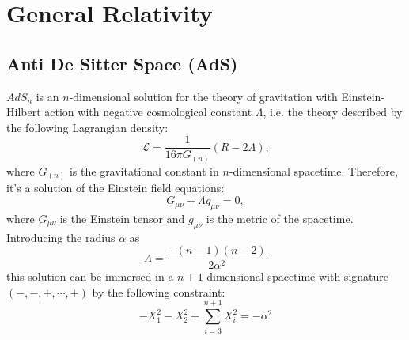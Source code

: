 \chapter{General Relativity}
\adjustmtc
\minitoc
{}
\section{Anti De Sitter Space (AdS)}
$AdS_n$ is an $n$-dimensional solution for the theory of gravitation with Einstein-Hilbert action with negative cosmological constant $\Lambda$, i.e. the theory described by the following Lagrangian density:
\begin{equation}
\mathcal{L} = \frac{1}{16\pi G_{(n)}}(R-2\Lambda),
\end{equation}
where $G_{(n)}$ is the gravitational constant in $n$-dimensional spacetime. Therefore, it's a solution of the Einstein field equations:
\begin{equation}
G_{\mu\nu} + \Lambda g_{\mu\nu} = 0,
\end{equation}
where $G_{\mu\nu}$ is the Einstein tensor and $g_{\mu\nu}$ is the metric of the spacetime. Introducing the radius $\alpha$ as 
\begin{equation}
\Lambda = \frac{-(n-1)(n-2)}{2\alpha^2}
\end{equation}
this solution can be immersed in a $n+1$ dimensional spacetime with signature $(-,-,+,\cdots,+)$ by the following constraint:
\begin{equation}
-X^2_1 - X^2_2 + \sum_{i=3}^{n+1}X_i^2 = -\alpha^2
\end{equation}
